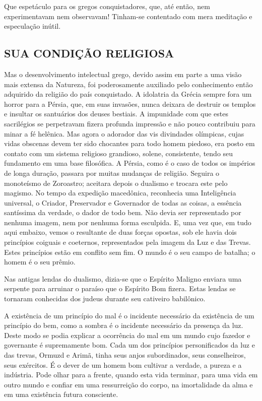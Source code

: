 \documentclass[11pt,a5paper,twoside,openany]{book}
\begin{document}
Que espetáculo para os gregos conquistadores, que, até então, nem experimentavam nem observavam! Tinham-se contentado com mera meditação e especulação inútil.

\subsection*{SUA CONDIÇÃO RELIGIOSA}
Mas o desenvolvimento intelectual grego, devido assim em parte a uma visão mais extensa da Natureza, foi poderosamente auxiliado pelo conhecimento então adquirido da religião do país conquistado. A idolatria da Grécia sempre fora um horror para a Pérsia, que, em suas invasões, nunca deixara de destruir os templos e insultar os santuários dos deuses bestiais. A impunidade com que estes sacrilégios se perpetravam fizera profunda impressão e não pouco contribuiu para minar a fé helênica. Mas agora o adorador das vis divindades olímpicas, cujas vidas obscenas devem ter sido chocantes para todo homem piedoso, era posto em contato com um sistema religioso grandioso, solene, consistente, tendo seu fundamento em uma base filosófica. A Pérsia, como é o caso de todos os impérios de longa duração, passara por muitas mudanças de religião. Seguira o monoteísmo de Zoroastro; aceitara depois o dualismo e trocara este pelo magismo. No tempo da expedição macedônica, reconhecia uma Inteligência universal, o Criador, Preservador e Governador de todas as coisas, a essência santíssima da verdade, o dador de todo bem. Não devia ser representado por nenhuma imagem, nem por nenhuma forma esculpida. E, uma vez que, em tudo aqui embaixo, vemos o resultante de duas forças opostas, sob ele havia dois princípios coiguais e coeternos, representados pela imagem da Luz e das Trevas. Estes princípios estão em conflito sem fim. O mundo é o seu campo de batalha; o homem é o seu prêmio.

Nas antigas lendas do dualismo, dizia-se que o Espírito Maligno enviara uma serpente para arruinar o paraíso que o Espírito Bom fizera. Estas lendas se tornaram conhecidas dos judeus durante seu cativeiro babilônico.

A existência de um princípio do mal é o incidente necessário da existência de um princípio do bem, como a sombra é o incidente necessário da presença da luz. Deste modo se podia explicar a ocorrência do mal em um mundo cujo fazedor e governante é supremamente bom. Cada um dos princípios personificados da luz e das trevas, Ormuzd e Arimã, tinha seus anjos subordinados, seus conselheiros, seus exércitos. É o dever de um homem bom cultivar a verdade, a pureza e a indústria. Pode olhar para a frente, quando esta vida terminar, para uma vida em outro mundo e confiar em uma ressurreição do corpo, na imortalidade da alma e em uma existência futura consciente.
\end{document}
